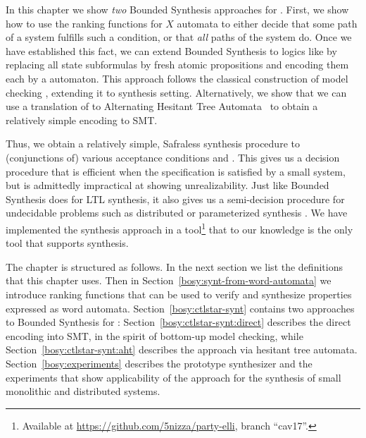 In this chapter we show \emph{two} Bounded Synthesis approaches for \CTLstar.
First, we show how to use the ranking functions for
$X$ automata to either decide that some path of a system fulfills such
a condition, or that \emph{all} paths of the system do. Once we have
established this fact, we can extend Bounded Synthesis to logics like
\CTLstar by replacing all state subformulas by fresh atomic
propositions and encoding them each by a \buchi automaton. This
approach follows the classical construction
\cite{DBLP:journals/toplas/ClarkeES86} of model checking \CTLstar,
extending it to synthesis setting.
Alternatively, we show that we can
use a translation of \CTLstar to Alternating Hesitant Tree Automata~\cite{ATA}
to obtain a relatively simple encoding to SMT.

Thus, we obtain a relatively simple, Safraless synthesis procedure to
(conjunctions of) various acceptance conditions and \CTLstar. This
gives us a decision procedure that is efficient when the
specification is satisfied by a small system, but is admittedly
impractical at showing unrealizability.
Just like Bounded Synthesis does for LTL synthesis,
it also gives us a semi-decision procedure for
undecidable problems such as distributed
\cite{DBLP:conf/focs/PnueliR90} or parameterized synthesis \cite{JB12,party}.
We have implemented the \CTLstar synthesis
approach in a tool\footnote{%
Available at \url{https://github.com/5nizza/party-elli}, branch ``cav17''.
}
that to our knowledge is the only tool that
supports \CTLstar synthesis.

The chapter is structured as follows.
In the next section we list the definitions that this chapter uses.
Then in Section~\ref{bosy:synt-from-word-automata} we introduce ranking functions that can be used to verify
and synthesize properties expressed as word automata.
Section~\ref{bosy:ctlstar-synt} contains two approaches to Bounded Synthesis for \CTLstar:
Section~\ref{bosy:ctlstar-synt:direct}
describes the direct encoding into SMT,
in the spirit of bottom-up \CTLstar model checking,
while Section~\ref{bosy:ctlstar-synt:aht} describes the approach via hesitant tree automata.
Section~\ref{bosy:experiments} describes the prototype \CTLstar synthesizer and
the experiments that show applicability of the approach for the synthesis of
small monolithic and distributed systems.

%

